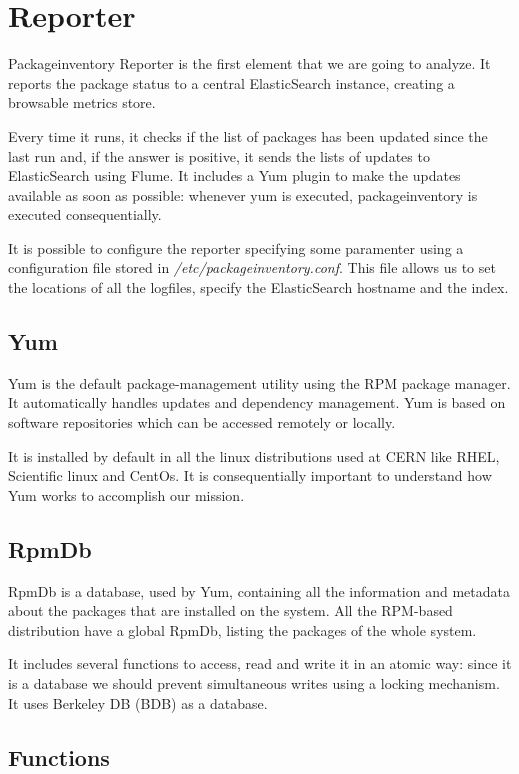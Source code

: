 \section{Reporter}

Packageinventory Reporter is the first element that we are going to
analyze. It reports the package status to a central ElasticSearch
instance, creating a browsable metrics store.

Every time it runs, it checks if the list of packages has been updated
since the last run and, if the answer is positive, it sends the lists of
updates to ElasticSearch using Flume. It includes a Yum plugin to make the
updates available as soon as possible: whenever yum is executed,
packageinventory is executed consequentially.

It is possible to configure the reporter specifying some paramenter using
a configuration file stored in \textit{/etc/packageinventory.conf}. This
file allows us to set the locations of all the logfiles, specify the
ElasticSearch hostname and the index.

\subsection{Yum}

Yum is the default package-management utility using the RPM package
manager. It automatically handles updates and dependency management. Yum
is based on software repositories which can be accessed remotely or
locally.

It is installed by default in all the linux distributions used at CERN
like RHEL, Scientific linux and CentOs. It is consequentially important to
understand how Yum works to accomplish our mission.

\subsection{RpmDb}

RpmDb is a database, used by Yum, containing all the information and
metadata about the packages that are installed on the system. All the
RPM-based distribution have a global RpmDb, listing the packages of the
whole system.

It includes several functions to access, read and write it in an atomic
way: since it is a database we should prevent simultaneous writes using
a locking mechanism. It uses Berkeley DB (BDB) as a database.

\subsection{Functions}


